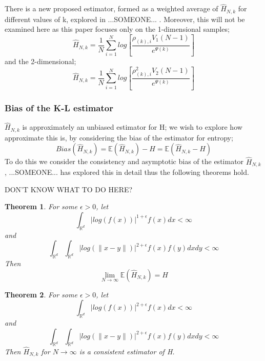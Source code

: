\documentclass{article}
\newtheorem{theorem}{Theorem}
\begin{document}
There is a new proposed estimator, formed as a weighted average of $\hat{H}_{N, k}$ for different values of k, explored in ...SOMEONE... . Moreover, this will not be examined here as this paper focuses only on the 1-dimensional samples;
\begin{equation} \label{KLestd=1}
\hat{H}_{N, k} = \frac{1}{N} \sum_{i=1}^{N} log \left[ \frac{\rho_{(k),i} V_{1} (N-1)}{e^{\Psi(k)}} \right]
\end{equation}
and the 2-dimensional;
\begin{equation} \label{KLestd=2}
\hat{H}_{N, k} = \frac{1}{N} \sum_{i=1}^{N} log \left[ \frac{\rho_{(k),i}^{2} V_{2} (N-1)}{e^{\Psi(k)}} \right]
\end{equation}



\subsubsection{Bias of the K-L estimator}
$\hat{H}_{N, k}$ is approximately an unbiased estimator for H; we wish to explore how approximate this is, by considering the bias of the estimator for entropy;
\begin{equation} \label{Bias}
Bias(\hat{H}_{N, k} ) = \mathbb{E}(\hat{H}_{N, k}) - H = \mathbb{E}(\hat{H}_{N, k} - H)
\end{equation}
To do this we consider the consistency and asymptotic bias of the estimator $\hat{H}_{N, k}$, ...SOMEONE... has explored this in detail thus the following theorems hold.

DON'T KNOW WHAT TO DO HERE?

\begin{theorem} \label{Paper1Thm1}
For some $\epsilon > 0$, let
\begin{equation}
\int_{\mathbb{R}^{d}} | log(f(x))|^{1 + \epsilon} f(x) dx < \infty
\end{equation}
and
\begin{equation}
\int_{\mathbb{R}^{d}} \int_{\mathbb{R}^{d}} | log(\|x-y\|)|^{2+ \epsilon} f(x) f(y) dx dy < \infty
\end{equation}
Then
\begin{equation}
\lim_{N \to \infty} \mathbb{E} (\hat{H}_{N, k}) = H
\end{equation}
\end{theorem}

\begin{theorem} \label{Paper1Thm2-Consistency}
For some $\epsilon > 0$, let
\begin{equation}
\int_{\mathbb{R}^{d}} | log(f(x))|^{2 + \epsilon} f(x) dx < \infty
\end{equation}
and
\begin{equation}
\int_{\mathbb{R}^{d}} \int_{\mathbb{R}^{d}} | log(\|x-y\|)|^{2+ \epsilon} f(x) f(y) dx dy < \infty
\end{equation}
Then $\hat{H}_{N, k}$ for $N \to \infty$ is a consistent estimator of H.
\end{theorem}
\end{document}
